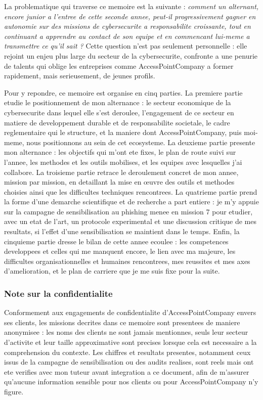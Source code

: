 \documentclass[11pt,a4paper]{article}
\begin{document}
La problematique qui traverse ce memoire est la suivante : \emph{comment un alternant, encore junior a l'entree de cette seconde annee, peut-il progressivement gagner en autonomie sur des missions de cybersecurite a responsabilite croissante, tout en continuant a apprendre au contact de son equipe et en commencant lui-meme a transmettre ce qu'il sait ?} Cette question n'est pas seulement personnelle : elle rejoint un enjeu plus large du secteur de la cybersecurite, confronte a une penurie de talents qui oblige les entreprises comme AccessPointCompany a former rapidement, mais serieusement, de jeunes profils.

Pour y repondre, ce memoire est organise en cinq parties. La premiere partie etudie le positionnement de mon alternance : le secteur economique de la cybersecurite dans lequel elle s'est deroulee, l'engagement de ce secteur en matiere de developpement durable et de responsabilite societale, le cadre reglementaire qui le structure, et la maniere dont AccessPointCompany, puis moi-meme, nous positionnons au sein de cet ecosysteme. La deuxieme partie presente mon alternance : les objectifs qui m'ont ete fixes, le plan de route suivi sur l'annee, les methodes et les outils mobilises, et les equipes avec lesquelles j'ai collabore. La troisieme partie retrace le deroulement concret de mon annee, mission par mission, en detaillant la mise en \oe uvre des outils et methodes choisies ainsi que les difficultes techniques rencontrees. La quatrieme partie prend la forme d'une demarche scientifique et de recherche a part entiere : je m'y appuie sur la campagne de sensibilisation au phishing menee en mission 7 pour etudier, avec un etat de l'art, un protocole experimental et une discussion critique de mes resultats, si l'effet d'une sensibilisation se maintient dans le temps. Enfin, la cinquieme partie dresse le bilan de cette annee ecoulee : les competences developpees et celles qui me manquent encore, le lien avec ma majeure, les difficultes organisationnelles et humaines rencontrees, mes reussites et mes axes d'amelioration, et le plan de carriere que je me suis fixe pour la suite.

\subsubsection*{Note sur la confidentialite}

Conformement aux engagements de confidentialite d'AccessPointCompany envers ses clients, les missions decrites dans ce memoire sont presentees de maniere anonymisee : les noms des clients ne sont jamais mentionnes, seuls leur secteur d'activite et leur taille approximative sont precises lorsque cela est necessaire a la comprehension du contexte. Les chiffres et resultats presentes, notamment ceux issus de la campagne de sensibilisation ou des audits realises, sont reels mais ont ete verifies avec mon tuteur avant integration a ce document, afin de m'assurer qu'aucune information sensible pour nos clients ou pour AccessPointCompany n'y figure.
\end{document}
